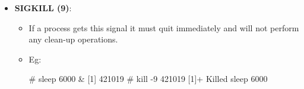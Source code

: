 \begin{flushleft}
\begin{itemize}
\begin{itemize}
\begin{itemize}
\begin{itemize}
\begin{tcolorbox}[breakable,notitle,boxrule=-0pt,colback=black,colframe=black]
						\newline
						\color{green}						
						\# kill -3 421019
						\newline
						\color{white}
						[1]+  Quit              (core dumped) sleep 6000
						\font=4pt
					\end{tcolorbox}
				\end{itemize}
			\item \textbf{SIGKILL (9)}: 
			\begin{itemize}
				\item If a process gets this signal it must quit immediately and will not perform any clean-up operations.
				\item Eg:
				\begin{tcolorbox}[breakable,notitle,boxrule=-0pt,colback=black,colframe=black]
					\color{green}
					\fontdimen2\font=9pt
					\# sleep 6000 \&
					\newline
					\color{white}
					[1] 421019
					\newline
					\newline
					\color{green}						
					\# kill -9 421019
					\newline
					\color{white}
					[1]+  Killed                  sleep 6000
					\fontdimen2\font=4pt
				\end{tcolorbox}
			\end{itemize}
		

\end{itemize}
\end{itemize}
\end{itemize}
\end{flushleft}
